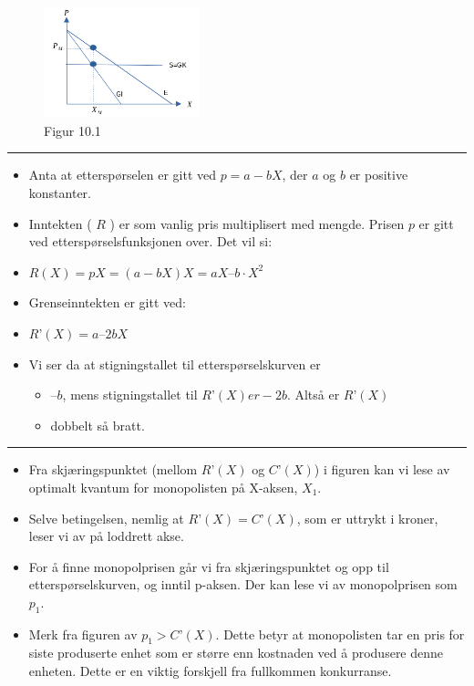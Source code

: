 \documentclass[
  letterpaper,
  DIV=11,
  numbers=noendperiod]{scrartcl}
\providecommand{\tightlist}{%
  \setlength{\itemsep}{0pt}\setlength{\parskip}{0pt}}\usepackage{longtable,booktabs,array}
\begin{document}
\begin{figure}[H]

{\centering \includegraphics[width=0.4\textwidth,height=\textheight]{drawio/monoe.png}

}

\caption{Figur 10.1}

\end{figure}%

\begin{center}\rule{0.5\linewidth}{0.5pt}\end{center}

\begin{itemize}
\tightlist
\item
  Anta at etterspørselen er gitt ved \(p = a - bX\), der \(a\) og \(b\)
  er positive konstanter.
\item
  Inntekten ( \(R\) ) er som vanlig pris multiplisert med mengde. Prisen
  \(p\) er gitt ved etterspørselsfunksjonen over. Det vil si:
\item
  \(R(X) = pX = (a - bX)X = aX – b\cdot X^2\)
\item
  Grenseinntekten er gitt ved:
\item
  \(R’(X) = a – 2bX\)
\item
  Vi ser da at stigningstallet til etterspørselskurven er

  \begin{itemize}
  \tightlist
  \item
    \(–b\), mens stigningstallet til \(R’(X) er -2b\). Altså er
    \(R’(X)\)
  \item
    dobbelt så bratt.
  \end{itemize}
\end{itemize}

\begin{center}\rule{0.5\linewidth}{0.5pt}\end{center}

\begin{itemize}
\tightlist
\item
  Fra skjæringspunktet (mellom \(R’(X)\) og \(C’(X)\)) i figuren kan vi
  lese av optimalt kvantum for monopolisten på X-aksen, \(X_1\).
\item
  Selve betingelsen, nemlig at \(R’(X) = C’(X)\), som er uttrykt i
  kroner, leser vi av på loddrett akse.
\item
  For å finne monopolprisen går vi fra skjæringspunktet og opp til
  etterspørselskurven, og inntil p-aksen. Der kan lese vi av
  monopolprisen som \(p_1\).
\item
  Merk fra figuren av \(p_1 > C’(X)\). Dette betyr at monopolisten tar
  en pris for siste produserte enhet som er større enn kostnaden ved å
  produsere denne enheten. Dette er en viktig forskjell fra fullkommen
  konkurranse.
\end{itemize}
\end{document}
